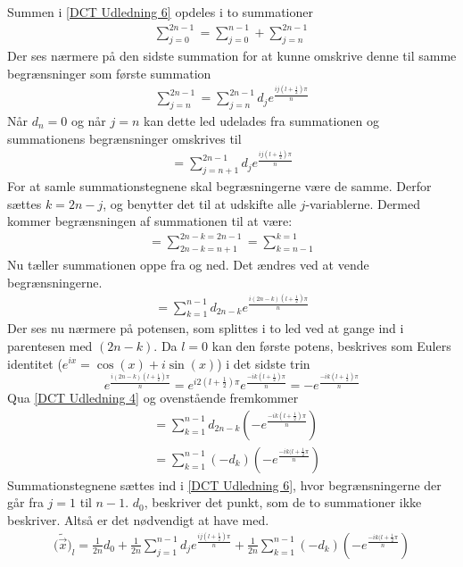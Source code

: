Summen i \ref{DCT Udledning 6} opdeles i to summationer
\begin{align*}
\sum^{2n-1}_{j=0} =\sum^{n-1}_{j=0} + \sum^{2n-1}_{j=n}
\end{align*}
Der ses nærmere på den sidste summation for at kunne omskrive denne til samme begrænsninger som første summation
\begin{align*}
\sum^{2n-1}_{j=n} =  \sum^{2n-1}_{j=n} d_j e^{\frac{ij(l+\frac{1}{2})\pi}{n}}
\end{align*}
Når $d_n = 0$ og når $j=n$ kan dette led udelades fra summationen og summationens begrænsninger omskrives til
\begin{align*}
=  \sum^{2n-1}_{j=n+1} d_j e^{\frac{ij(l+\frac{1}{2})\pi}{n}}
\end{align*}
For at samle summationstegnene skal begræsningerne være de samme. Derfor sættes $k = 2n - j$, og benytter det til at udskifte alle $j$-variablerne. Dermed kommer begrænsningen af summationen til at være:
\begin{align*}
=\sum^{2n-k = 2n-1}_{2n-k = n+1} =\sum^{k=1}_{k = n-1}
\end{align*}
Nu tæller summationen oppe fra og ned. Det ændres ved at vende begrænsningerne.
\begin{align*}
= \sum^{n-1}_{k=1} d_{2n-k} e^{\frac{i(2n-k)(l+\frac{1}{2})\pi}{n}}
\end{align*}
Der ses nu nærmere på potensen, som splittes i to led ved at gange ind i parentesen med $(2n-k)$. Da $l = 0$ kan den første potens, beskrives som Eulers identitet ($e^{ix}=\cos(x)+i\sin(x)$) i det sidste trin 
\begin{equation*}
e^{\frac{i(2n-k)(l+\frac{1}{2})\pi}{n}} = e^{i2(l+\frac{1}{2})\pi} e^{\frac{-ik(l+\frac{1}{2})\pi}{n}} = -e^{\frac{-ik(l+\frac{1}{2})\pi}{n}}
\end{equation*}
Qua \ref{DCT Udledning 4} og ovenstående fremkommer
\begin{align}
&= \sum^{n-1}_{k=1} d_{2n-k}(-e^{\frac{-ik(l+\frac{1}{2})\pi}{n}}) \\
&= \sum_{k=1}^{n-1} (-d_k)(-e^{\frac{-ik(l+\frac{1}{2}\pi}{n}})
\end{align}
Summationstegnene sættes ind i \ref{DCT Udledning 6}, hvor begrænsningerne der går fra $j=1$ til $n-1$. $d_{0}$, beskriver det punkt, som de to summationer ikke beskriver. Altså er det nødvendigt at have med.
\begin{align*} 
\Big(\tilde{\vec{x}}\Big)_l = \frac{1}{2n}d_0 + \frac{1}{2n} \sum_{j=1}^{n-1} d_j e^{\frac{ij(l+\frac{1}{2})\pi}{n}} + \frac{1}{2n} \sum_{k=1}^{n-1} (-d_k)(-e^{\frac{-ik(l+\frac{1}{2}\pi}{n}})
\end{align*}
